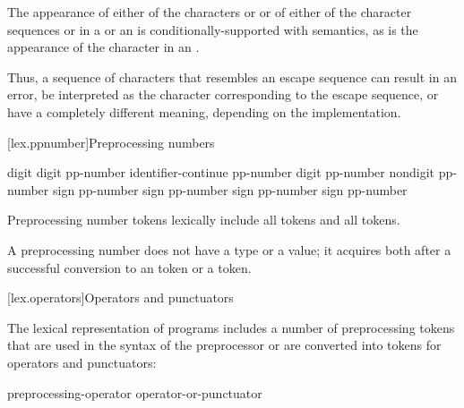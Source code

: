 \pnum
The appearance of either of the characters  or \tcode{\textbackslash} or of
either of the character sequences \tcode{/*} or \tcode{//} in a
 or an 
is conditionally-supported with  semantics, as is the appearance of the character
 in an .
\begin{footnote}
Thus, a sequence of characters
that resembles an escape sequence can result in an error, be interpreted as the
character corresponding to the escape sequence, or have a completely different meaning,
depending on the implementation.
\end{footnote}

[lex.ppnumber]{Preprocessing numbers}

%
\begin{bnf}
\br
    digit\br
     digit\br
    pp-number identifier-continue\br
    pp-number  digit\br
    pp-number  nondigit\br
    pp-number  sign\br
    pp-number  sign\br
    pp-number  sign\br
    pp-number  sign\br
    pp-number 
\end{bnf}

\pnum
Preprocessing number tokens lexically include
all  tokens and
all  tokens.

\pnum
A preprocessing number does not have a type or a value; it acquires both
after a successful conversion to
an  token or
a  token.%

[lex.operators]{Operators and punctuators}

\pnum
{}%
%
The lexical representation of \Cpp{} programs includes a number of
preprocessing tokens that are used in the syntax of the preprocessor or
are converted into tokens for operators and punctuators:

\begin{bnf}
\br
    preprocessing-operator\br
    operator-or-punctuator
\end{bnf}

